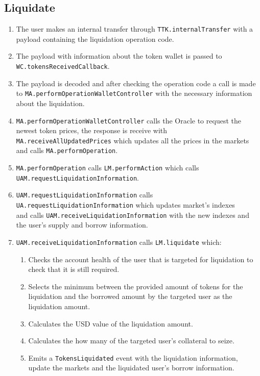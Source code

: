 \subsection{Liquidate}
\begin{enumerate}
  \item The user makes an internal transfer through \verb|TTK.internalTransfer| with a payload containing the liquidation operation code.
  \item The payload with information about the token wallet is passed to \\\verb|WC.tokensReceivedCallback|.
  \item The payload is decoded and after checking the operation code a call is made to \verb|MA.performOperationWalletController| with the necessary information about the liquidation.
  \item \verb|MA.performOperationWalletController| calls the Oracle to request the newest token prices, the response is receive with \\\verb|MA.receiveAllUpdatedPrices| which updates all the prices in the markets and calls \verb|MA.performOperation|.
  \item \verb|MA.performOperation| calls \verb|LM.performAction| which calls \\\verb|UAM.requestLiquidationInformation|.
  \item \verb|UAM.requestLiquidationInformation| calls \\\verb|UA.requestLiquidationInformation| which updates market's indexes \\and calls \verb|UAM.receiveLiquidationInformation| with the new indexes and the user's supply and borrow information.
  \item \verb|UAM.receiveLiquidationInformation| calls \verb|LM.liquidate| which:
  \begin{enumerate}
    \item Checks the account health of the user that is targeted for liquidation to check that it is still required.
    \item Selects the minimum between the provided amount of tokens for the liquidation and the borrowed amount by the targeted user as the liquidation amount. 
    \item Calculates the USD value of the liquidation amount.
    \item Calculates the how many of the targeted user's collateral to seize.
    \item Emits a \verb|TokensLiquidated| event with the liquidation information, update the markets and the liquidated user's borrow information.

\end{enumerate}
\end{enumerate}
